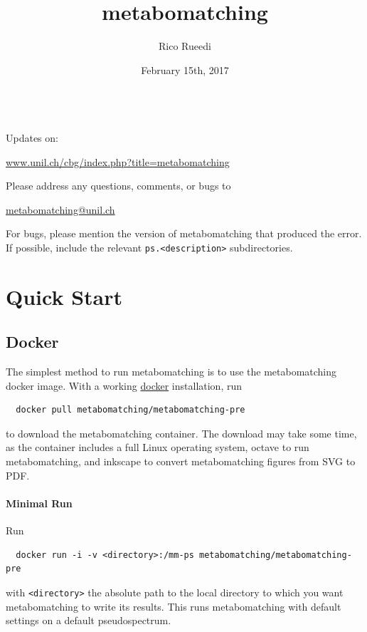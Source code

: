 \documentclass[a4paper,11pt]{article}
\title{metabomatching}
\author{Rico Rueedi}
\date{February 15th, 2017}
\begin{document}
\maketitle\quad\\[16mm]
Updates on:
\begin{center}\href{http://www.unil.ch/cbg/index.php?title=metabomatching}{www.unil.ch/cbg/index.php?title=metabomatching}\end{center}
Please address any questions, comments, or bugs to
\begin{center}
\href{mailto:metabomatching@unil.ch}{metabomatching@unil.ch}
\end{center}
For bugs, please mention the version of metabomatching that produced the error. If possible, include the relevant \verb|ps.<description>| subdirectories.
\tableofcontents
\clearpage
\section{Quick Start}
\subsection{Docker}
The simplest method to run metabomatching is to use the metabomatching docker image. With a working \href{http://www.docker.com/products/overview}{docker} installation, run
\begin{verbatim}
  docker pull metabomatching/metabomatching-pre
\end{verbatim}
to download the metabomatching container. The download may take some time, as the container includes a full Linux operating system, octave to run metabomatching, and inkscape to convert metabomatching figures from SVG to PDF. 
\paragraph{Minimal Run} Run
\begin{verbatim}
  docker run -i -v <directory>:/mm-ps metabomatching/metabomatching-pre
\end{verbatim}
with \verb|<directory>| the absolute path to the local directory to which you want metabomatching to write its results. This runs metabomatching with default settings on a default pseudospectrum.

\end{document}
